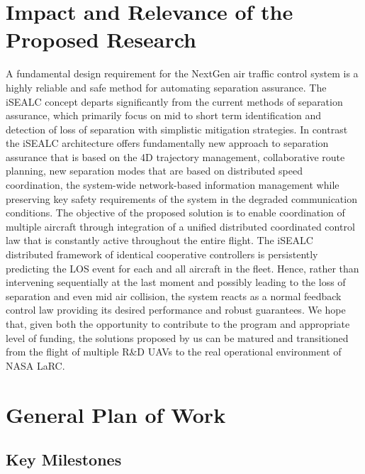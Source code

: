 \documentclass[letter,onecolumn,12pt]{aiaa-tc}
\newcommand{\1}{1_n}
\begin{document}
\section{Impact and Relevance of the Proposed Research}
A fundamental design requirement for the NextGen air traffic control system is a highly reliable and safe method for automating separation assurance. The iSEALC concept departs significantly from the current methods of separation assurance, which primarily focus on mid to short term identification and detection of loss of separation with simplistic mitigation strategies. In contrast the iSEALC architecture offers fundamentally new approach to separation assurance that is based on the 4D trajectory management, collaborative route planning, new separation modes that are based on distributed speed coordination, the system-wide network-based information management while preserving key safety requirements of the system in the degraded communication conditions. The objective of the proposed solution is to enable coordination of multiple aircraft through integration of a unified distributed coordinated control law that is constantly active throughout the entire flight. The iSEALC distributed framework of identical cooperative controllers is persistently predicting the LOS event for each and all aircraft in the fleet. Hence, rather than intervening sequentially at the last moment and possibly leading to the loss of separation and even mid air collision, the system reacts as a normal feedback control law providing its desired performance and robust guarantees. We hope that, given both the opportunity to contribute to the program and appropriate level of funding, the solutions proposed by us can be matured and transitioned from the flight of multiple R\&D UAVs to the real operational environment of NASA LaRC.




\section{General Plan of Work}

\subsection{Key Milestones}
\end{document}
